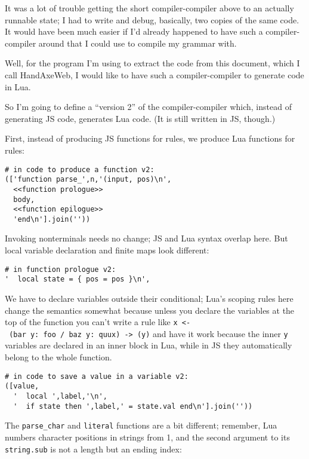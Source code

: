 \documentclass[
]{article}
\begin{document}
It was a lot of trouble getting the short compiler-compiler above to an
actually runnable state; I had to write and debug, basically, two copies
of the same code. It would have been much easier if I'd already happened
to have such a compiler-compiler around that I could use to compile my
grammar with.

Well, for the program I'm using to extract the code from this document,
which I call HandAxeWeb, I would like to have such a compiler-compiler
to generate code in Lua.

So I'm going to define a ``version 2'' of the compiler-compiler which,
instead of generating JS code, generates Lua code. (It is still written
in JS, though.)

First, instead of producing JS functions for rules, we produce Lua
functions for rules:

\begin{verbatim}
# in code to produce a function v2:
(['function parse_',n,'(input, pos)\n',
  <<function prologue>>
  body,
  <<function epilogue>>
  'end\n'].join(''))
\end{verbatim}

Invoking nonterminals needs no change; JS and Lua syntax overlap here.
But local variable declaration and finite maps look different:

\begin{verbatim}
# in function prologue v2:
'  local state = { pos = pos }\n',
\end{verbatim}

We have to declare variables outside their conditional; Lua's scoping
rules here change the semantics somewhat because unless you declare the
variables at the top of the function you can't write a rule like
\texttt{x\ \textless{}-\ (bar\ y:\ foo\ /\ baz\ y:\ quux)\ -\textgreater{}\ (y)}
and have it work because the inner \texttt{y} variables are declared in
an inner block in Lua, while in JS they automatically belong to the
whole function.

\begin{verbatim}
# in code to save a value in a variable v2:
([value,
  '  local ',label,'\n',
  '  if state then ',label,' = state.val end\n'].join(''))
\end{verbatim}

The \texttt{parse\_char} and \texttt{literal} functions are a bit
different; remember, Lua numbers character positions in strings from 1,
and the second argument to its \texttt{string.sub} is not a length but
an ending index:
\end{document}
